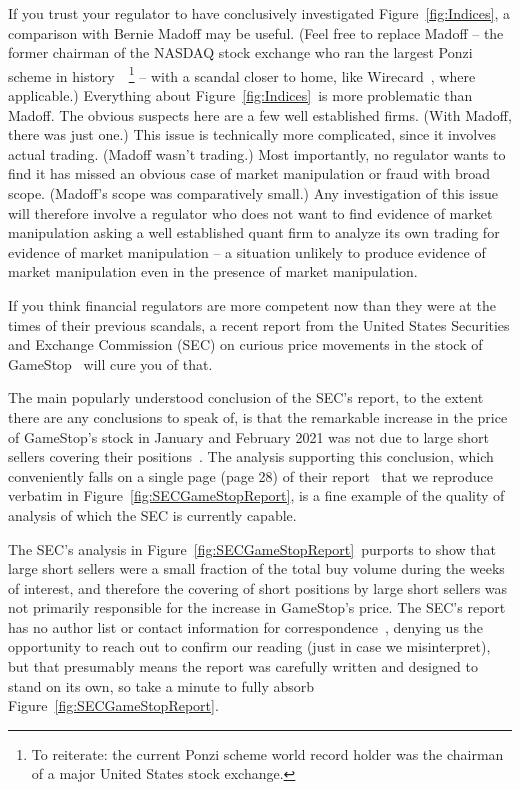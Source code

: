 \documentclass[twocolumn,twoside,prd,floatfix,letterpaper]{revtex4}
\def \FigMain {Figure~\ref{fig:Indices}}
\def \FigSEC {Figure~\ref{fig:SECGameStopReport}}
\begin{document}
If you trust your regulator to have conclusively investigated \FigMain, a comparison with Bernie Madoff may be useful.  (Feel free to replace Madoff -- the former chairman of the NASDAQ stock exchange who ran the largest Ponzi scheme in history~\cite{markopolos2010no}~\footnote{To reiterate:  the current Ponzi scheme world record holder was the chairman of a major United States stock exchange.} -- with a scandal closer to home, like Wirecard~\cite{WirecardFT}, where applicable.)  Everything about \FigMain\ is more problematic than Madoff.  The obvious suspects here are a few well established firms.  (With Madoff, there was just one.)  This issue is technically more complicated, since it involves actual trading.  (Madoff wasn't trading.)  Most importantly, no regulator wants to find it has missed an obvious case of market manipulation or fraud with broad scope.  (Madoff's scope was comparatively small.)  Any investigation of this issue will therefore involve a regulator who does not want to find evidence of market manipulation asking a well established quant firm to analyze its own trading for evidence of market manipulation -- a situation unlikely to produce evidence of market manipulation even in the presence of market manipulation.

If you think financial regulators are more competent now than they were at the times of their previous scandals, a recent report from the United States Securities and Exchange Commission (SEC) on curious price movements in the stock of GameStop~\cite{SECGameStopReport} will cure you of that.

The main popularly understood conclusion of the SEC's report, to the extent there are any conclusions to speak of, is that the remarkable increase in the price of GameStop's stock in January and February 2021 was not due to large short sellers covering their positions~\cite{levine2021gamestop,orland2021,salzman2021,martin2021,bain2021,rainey2021gamestop,mcenery2021,rearick2021,ongweso2021,harty2021}.  The analysis supporting this conclusion, which conveniently falls on a single page (page 28) of their report~\cite{SECGameStopReport} that we reproduce verbatim in \FigSEC, is a fine example of the quality of analysis of which the SEC is currently capable.

The SEC's analysis in \FigSEC\ purports to show that large short sellers were a small fraction of the total buy volume during the weeks of interest, and therefore the covering of short positions by large short sellers was not primarily responsible for the increase in GameStop's price.  The SEC's report has no author list or contact information for correspondence~\cite{SECGameStopReport}, denying us the opportunity to reach out to confirm our reading (just in case we misinterpret), but that presumably means the report was carefully written and designed to stand on its own, so take a minute to fully absorb \FigSEC.
\end{document}
